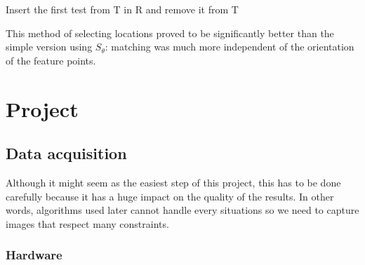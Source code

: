 \documentclass[12pt]{article}
\begin{document}
\begin{algorithm}[H]

  Insert the first test from T in R and remove it from T\;

\end{algorithm}

This method of selecting locations proved to be significantly better than the simple version using $S_\theta$: matching was much more independent of the orientation of the feature points.

\section{Project}
\subsection{Data acquisition}

Although it might seem as the easiest step of this project, this has to be done carefully because it has a huge impact on the quality of the results. In other words, algorithms used later cannot handle every situations so we need to capture images that respect many constraints. 

\subsubsection{Hardware}
\end{document}
